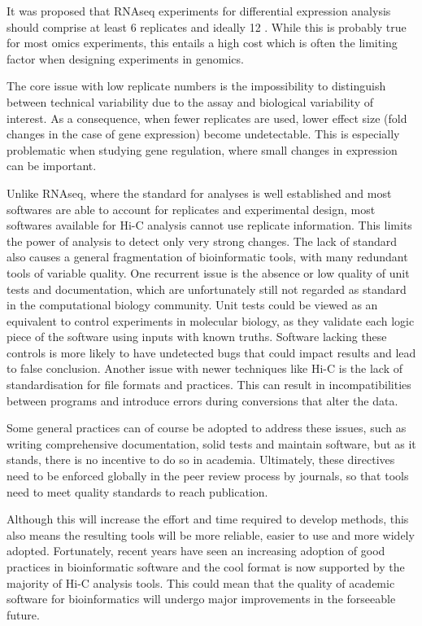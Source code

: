 It was proposed that RNAseq experiments for differential expression analysis should comprise at least 6 replicates and ideally 12 \cite{schurchHowManyBiological2016}. While this is probably true for most omics experiments, this entails a high cost which is often the limiting factor when designing experiments in genomics.

The core issue with low replicate numbers is the impossibility to distinguish between technical variability due to the assay and biological variability of interest. As a consequence, when fewer replicates are used, lower effect size (fold changes in the case of gene expression) become undetectable. This is especially problematic when studying gene regulation, where small changes in expression can be important.


Unlike RNAseq, where the standard for analyses is well established and most softwares are able to account for replicates and experimental design, most softwares available for Hi-C analysis cannot use replicate information. This limits the power of analysis to detect only very strong changes. The lack of standard also causes a general fragmentation of bioinformatic tools, with many redundant tools of variable quality. One recurrent issue is the absence or low quality of unit tests and documentation, which are unfortunately still not regarded as standard in the computational biology community. Unit tests could be viewed as an equivalent to control experiments in molecular biology, as they validate each logic piece of the software using inputs with known truths. Software lacking these controls is more likely to have undetected bugs that could impact results and lead to false conclusion.
Another issue with newer techniques like Hi-C is the lack of standardisation for file formats and practices. This can result in incompatibilities between programs and introduce errors during conversions that alter the data.

Some general practices can of course be adopted to address these issues, such as writing comprehensive documentation, solid tests and maintain software, but as it stands, there is no incentive to do so in academia. Ultimately, these directives need to be enforced globally in the peer review process by journals, so that tools need to meet quality standards to reach publication.

Although this will increase the effort and time required to develop methods, this also means the resulting tools will be more reliable, easier to use and more widely adopted. Fortunately, recent years have seen an increasing adoption of good practices in bioinformatic software and the cool format is now supported by the majority of Hi-C analysis tools. This could mean that the quality of academic software for bioinformatics will undergo major improvements in the forseeable future. 